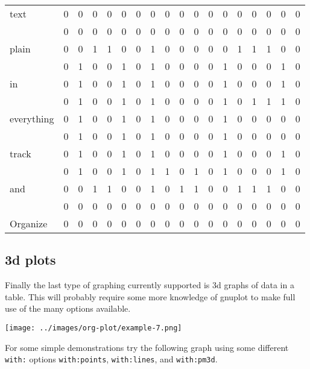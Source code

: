 \documentclass[11pt]{article}
\begin{document}
\begin{center}
\begin{tabular}{lrrrrrrrrrrrrrrrrr}
text & 0 & 0 & 0 & 0 & 0 & 0 & 0 & 0 & 0 & 0 & 0 & 0 & 0 & 0 & 0 & 0 & 0\\
 & 0 & 0 & 0 & 0 & 0 & 0 & 0 & 0 & 0 & 0 & 0 & 0 & 0 & 0 & 0 & 0 & 0\\
plain & 0 & 0 & 1 & 1 & 0 & 0 & 1 & 0 & 0 & 0 & 0 & 0 & 1 & 1 & 1 & 0 & 0\\
 & 0 & 1 & 0 & 0 & 1 & 0 & 1 & 0 & 0 & 0 & 0 & 1 & 0 & 0 & 0 & 1 & 0\\
in & 0 & 1 & 0 & 0 & 1 & 0 & 1 & 0 & 0 & 0 & 0 & 1 & 0 & 0 & 0 & 1 & 0\\
 & 0 & 1 & 0 & 0 & 1 & 0 & 1 & 0 & 0 & 0 & 0 & 1 & 0 & 1 & 1 & 1 & 0\\
everything & 0 & 1 & 0 & 0 & 1 & 0 & 1 & 0 & 0 & 0 & 0 & 1 & 0 & 0 & 0 & 0 & 0\\
 & 0 & 1 & 0 & 0 & 1 & 0 & 1 & 0 & 0 & 0 & 0 & 1 & 0 & 0 & 0 & 0 & 0\\
track & 0 & 1 & 0 & 0 & 1 & 0 & 1 & 0 & 0 & 0 & 0 & 1 & 0 & 0 & 0 & 1 & 0\\
 & 0 & 1 & 0 & 0 & 1 & 0 & 1 & 1 & 0 & 1 & 0 & 1 & 0 & 0 & 0 & 1 & 0\\
and & 0 & 0 & 1 & 1 & 0 & 0 & 1 & 0 & 1 & 1 & 0 & 0 & 1 & 1 & 1 & 0 & 0\\
 & 0 & 0 & 0 & 0 & 0 & 0 & 0 & 0 & 0 & 0 & 0 & 0 & 0 & 0 & 0 & 0 & 0\\
Organize & 0 & 0 & 0 & 0 & 0 & 0 & 0 & 0 & 0 & 0 & 0 & 0 & 0 & 0 & 0 & 0 & 0\\
\end{tabular}
\end{center}

\subsection*{3d plots}
\label{sec:org690cae9}

Finally the last type of graphing currently supported is 3d graphs of
data in a table.  This will probably require some more knowledge of
gnuplot to make full use of the many options available.

\begin{center}
\texttt{[image: ../images/org-plot/example-7.png]}
\end{center}

For some simple demonstrations try the following graph using some
different \texttt{with:} options \texttt{with:points}, \texttt{with:lines}, and
\texttt{with:pm3d}.
\end{document}
